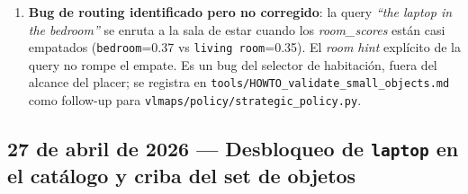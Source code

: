 \documentclass[11pt,a4paper]{article}
\begin{document}
\begin{enumerate}
        búsqueda. \texttt{kettle} pasa de 0/6 a 3/6 y \texttt{teapot}
        de 4/8 a 7/8. Las regresiones (\texttt{trash\,bin} 3/6 $\to$ 2/6)
        se atribuyen al \emph{floor offset} de 80\,cm que mueve el bin
        fuera del centroide de la habitación; queda como TODO reducirlo.
  \item \textbf{Bug de routing identificado pero no corregido}: la query
        \emph{``the laptop in the bedroom''} se enruta a la sala de estar
        cuando los \emph{room\_scores} están casi empatados
        (\texttt{bedroom}=0.37 vs \texttt{living\,room}=0.35). El
        \emph{room hint} explícito de la query no rompe el empate. Es un
        bug del selector de habitación, fuera del alcance del placer; se
        registra en \texttt{tools/HOWTO\_validate\_small\_objects.md}
        como follow-up para
        \texttt{vlmaps/policy/strategic\_policy.py}.
\end{enumerate}

\subsection*{27 de abril de 2026 --- Desbloqueo de \texttt{laptop} en el catálogo y criba del set de objetos}
\end{document}
